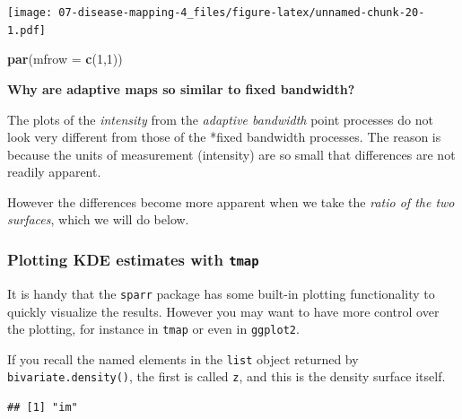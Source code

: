 \documentclass[
]{book}
\newenvironment{Shaded}{\begin{snugshade}}{\end{snugshade}}
\newcommand{\AttributeTok}[1]{\textcolor[rgb]{0.13,0.29,0.53}{#1}}
\newcommand{\DecValTok}[1]{\textcolor[rgb]{0.00,0.00,0.81}{#1}}
\newcommand{\FunctionTok}[1]{\textcolor[rgb]{0.13,0.29,0.53}{\textbf{#1}}}
\newcommand{\NormalTok}[1]{#1}
\newcommand{\SpecialCharTok}[1]{\textcolor[rgb]{0.81,0.36,0.00}{\textbf{#1}}}
\newenvironment{rmdnote}[1]
  {
  \begin{itemize}
  \renewcommand{\labelitemi}{
    \raisebox{-.7\height}[0pt][0pt]{
      {\setkeys{Gin}{width=3em,keepaspectratio}\texttt{[image: images/\#1]}}
    }
  }
  \setlength{\fboxsep}{1em}
  \begin{note}
  \item
  }
  {
  \end{note}
  \end{itemize}
  }
\begin{document}
\texttt{[image: 07-disease-mapping-4\_files/figure-latex/unnamed-chunk-20-1.pdf]}

\begin{Shaded}
\begin{Highlighting}[]
\FunctionTok{par}\NormalTok{(}\AttributeTok{mfrow =} \FunctionTok{c}\NormalTok{(}\DecValTok{1}\NormalTok{,}\DecValTok{1}\NormalTok{))}
\end{Highlighting}
\end{Shaded}

\begin{rmdnote}{note}
\textbf{Why are adaptive maps so similar to fixed bandwidth?}

The plots of the \emph{intensity} from the \emph{adaptive bandwidth} point processes do not look very different from those of the *fixed bandwidth processes. The reason is because the units of measurement (intensity) are so small that differences are not readily apparent.

However the differences become more apparent when we take the \emph{ratio of the two surfaces}, which we will do below.

\end{rmdnote}

\hypertarget{plotting-kde-estimates-with-tmap}{%
\subsubsection{\texorpdfstring{Plotting KDE estimates with \texttt{tmap}}{Plotting KDE estimates with tmap}}\label{plotting-kde-estimates-with-tmap}}

It is handy that the \texttt{sparr} package has some built-in plotting functionality to quickly visualize the results. However you may want to have more control over the plotting, for instance in \texttt{tmap} or even in \texttt{ggplot2}.

If you recall the named elements in the \texttt{list} object returned by \texttt{bivariate.density()}, the first is called \texttt{z}, and this is the density surface itself.

\begin{Shaded}
\end{Shaded}

\begin{verbatim}
## [1] "im"
\end{verbatim}
\end{document}
